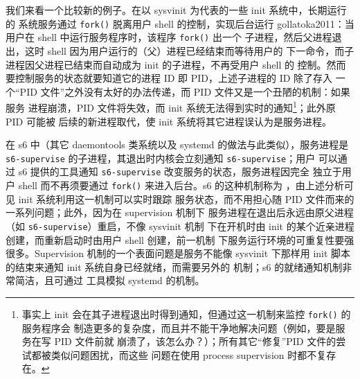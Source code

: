 我们来看一个比较新的例子。在以 sysvinit 为代表的一些 init 系统中，长期运行的
系统服务通过 \verb|fork()| 脱离用户 shell 的控制，实现后台运行\cupercite%
{gollatoka2011}：当用户在 shell 中运行服务程序时，该程序 \verb|fork()| 出一个
子进程，然后父进程退出，这时 shell 因为用户运行的（父）进程已经结束而等待用户的
下一命令，而子进程因父进程已结束而自动成为 init 的子进程，不再受用户 shell 的
控制。然而要控制服务的状态就要知道它的进程 ID 即 PID，上述子进程的 ID 除了存入
一个“PID 文件”之外没有太好的办法传递，而 PID 文件又是一个丑陋的机制：如果服务
进程崩溃，PID 文件将失效，而 init 系统无法得到实时的通知\footnote{事实上 init
会在其子进程退出时得到通知，但通过这一机制来监控 \texttt{fork()} 的服务程序会
制造更多的复杂度，而且并不能干净地解决问题（例如，要是服务在写 PID 文件前就
崩溃了，该怎么办？）；所有其它“修复”PID 文件的尝试都被类似问题困扰，而这些
问题在使用 process supervision 时都不复存在。}；此外原 PID 可能被
后续的新进程取代，使 init 系统将其它进程误认为是服务进程。

在 s6 中（其它 daemontools 类系统以及 systemd 的做法与此类似），服务进程是
\verb|s6-supervise| 的子进程，其退出时内核会立刻通知 \verb|s6-supervise|；用户
可以通过 s6 提供的工具通知 \verb|s6-supervise| 改变服务的状态，服务进程因完全
独立于用户 shell 而不再须要通过 \verb|fork()| 来进入后台。s6 的这种机制称为%
，由上述分析可见 init 系统利用这一机制可以实时跟踪
服务状态，而不用担心随 PID 文件而来的一系列问题；此外，因为在 supervision 机制下
服务进程在退出后永远由原父进程（如 \verb|s6-supervise|）重启，不像 sysvinit 机制
下在开机时由 init 的某个近亲进程创建，而重新启动时由用户 shell 创建，前一机制
下服务运行环境的可重复性要强很多。Supervision 机制的一个表面问题是服务不能像
sysvinit 下那样用 init 脚本的结束来通知 init 系统自身已经就绪，而需要另外的
机制；s6 的就绪通知机制非常简洁，且可通过
工具模拟 systemd 的机制。

